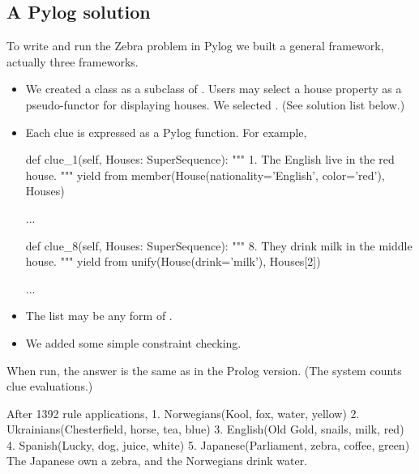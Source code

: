 \subsection{A Pylog solution}

To write and run the Zebra problem in Pylog we built a general framework, actually three frameworks. 
\begin{itemize}
    \item \sloppy We created a  class as a subclass of . Users may select a house property as a pseudo-functor for displaying houses. We selected . (See solution list below.)

    \item Each clue is expressed as a Pylog function. For example, 

        \begin{python}
          def clue_1(self, Houses: SuperSequence):
            """ 1. The English live in the red house.  """
            yield from member(House(nationality='English', color='red'), Houses)

          ...
  
          def clue_8(self, Houses: SuperSequence):
            """ 8. They drink milk in the middle house. """
            yield from unify(House(drink='milk'), Houses[2])

          ...
\end{python}

    \item The  list may be any form of .
    
    \item We added some simple constraint checking.
\end{itemize}
When run, the answer is the same as in the Prolog version. (The system counts clue evaluations.)

\begin{minipage}{\linewidth}
\begin{python}
After 1392 rule applications, 
	1. Norwegians(Kool, fox, water, yellow)
	2. Ukrainians(Chesterfield, horse, tea, blue)
	3. English(Old Gold, snails, milk, red)
	4. Spanish(Lucky, dog, juice, white)
	5. Japanese(Parliament, zebra, coffee, green)
The Japanese own a zebra, and the Norwegians drink water.
\end{python}
\end{minipage}

